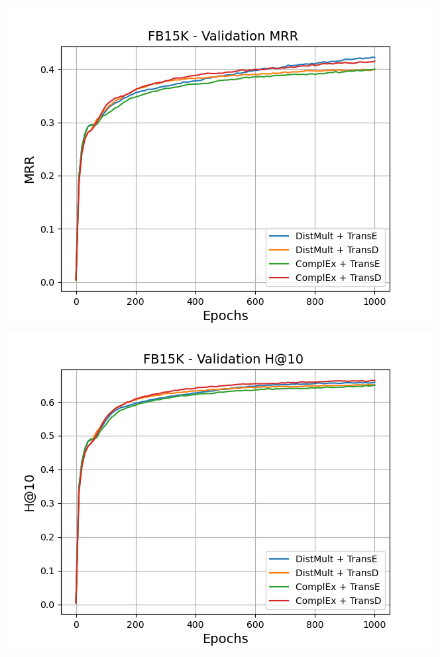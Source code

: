 \begin{figure}
    \centering
    \begin{minipage}{.5\textwidth}
      \centering
      \includegraphics[width=\linewidth]{figures/results/gan_train/not_pretrained/random/fb15k/1k_epochs/random_fb15k_mrrs.png}
    \end{minipage}%
    \begin{minipage}{.5\textwidth}
      \centering
      \includegraphics[width=\linewidth]{figures/results/gan_train/not_pretrained/random/fb15k/1k_epochs/random_fb15k_hit10.png}
    \end{minipage}
    

\end{figure}
